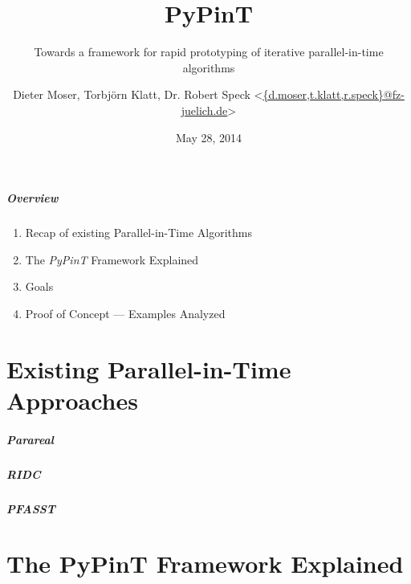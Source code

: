 \documentclass[%
  english,
  hyperref={pdfpagelabels=false},
  aspectratio=1610]{beamer}
\title{PyPinT}
\subtitle{Towards a framework for rapid prototyping of iterative parallel-in-time algorithms}
\author{Dieter Moser, Torbjörn Klatt, Dr. Robert Speck
  <\href{mailto:d.moser@fz-juelich.de}{\{d.moser,t.klatt,r.speck\}@fz-juelich.de}>%
}
\institute{3rd Workshop on Parallel-in-Time Integration Methods}
\date{May 28, 2014}
\begin{document}
\maketitle

\begin{frame}
  \frametitle{Overview}
  \begin{enumerate}
    \item Recap of existing Parallel-in-Time Algorithms
    \item The \emph{PyPinT} Framework Explained
    \item Goals
    \item Proof of Concept --- Examples Analyzed
  \end{enumerate}
\end{frame}


\part{Existing Parallel-in-Time Approaches}
\makepart

\begin{frame}
  \frametitle{Parareal}
\end{frame}

\begin{frame}
  \frametitle{RIDC}
\end{frame}

\begin{frame}
  \frametitle{PFASST}
\end{frame}


\part{The PyPinT Framework Explained}
\makepart
\end{document}
